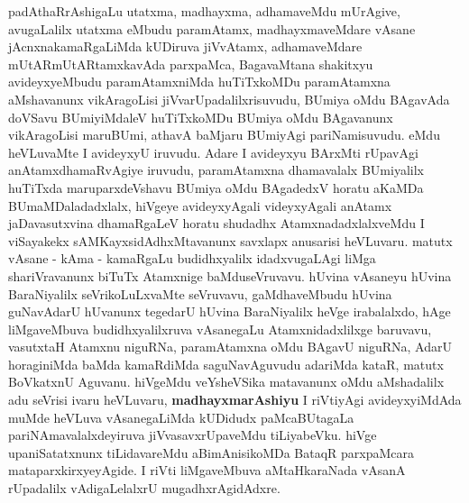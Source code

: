 \begin{artha}
padAthaRrAshigaLu utatxma, madhayxma, adhamaveMdu mUrAgive,
avugaLalilx utatxma eMbudu paramAtamx, madhayxmaveMdare vAsane
jAcnxnakamaRgaLiMda kUDiruva jiVvAtamx, adhamaveMdare
mUtARmUtARtamxkavAda parxpaMca, BagavaMtana \-shakitxyu avideyxyeMbudu
paramAtamxniMda huTiTxkoMDu paramAtamxna aMshavanunx vikAra\-goLisi
jiVvarUpadalilxrisuvudu, BUmiya oMdu BAgavAda doVSavu BUmi\-yiMdaleV
huTiTxkoMDu BUmiya oMdu BAgavanunx vikAragoLisi maruBUmi, athavA
baMjaru BUmiyAgi pariNamisuvudu. eMdu heVLuvaMte I \break avideyxyU
iruvudu. Adare I avideyxyu BArxMti rUpavAgi anAtamxdhamaR\-vAgiye
iruvudu, paramAtamxna dhamavalalx BUmiyalilx huTiTxda maruparxdeVshavu
BUmiya oMdu BAgadedxV horatu aKaMDa BUmaMDaladadxlalx, hiVgeye
avideyx\-yAgali videyxyAgali anAtamx jaDavasutxvina dhamaRgaLeV horatu
shudadhx Atamxnadadxlalx\-veMdu I viSayakekx sAMKayxsidAdhxMtavanunx
savxlapx anusarisi heVLuvaru. matutx vAsane - kAma - kamaRgaLu
budidhxyalilx idadxvugaLAgi liMga shariVravanunx biTuTx Atamxnige
baMduseVruvavu. hUvina vAsaneyu hUvina BaraNiyalilx seVrikoLuLxvaMte
seVru\-vavu, gaMdhaveMbudu hUvina guNavAdarU hUvanunx tegedarU hUvina
BaraNi\-yalilx heVge irabalalxdo, hAge liMgaveMbuva budidhxyalilxruva
vAsanegaLu Atamx\-nidadxlilxge baruvavu, vasutxtaH Atamxnu niguRNa,
paramAtamxna oMdu BAgavU \break niguRNa, AdarU horaginiMda baMda kamaRdiMda
saguNavAguvudu adariMda kataR, matutx BoVkatxnU Aguvanu. hiVgeMdu
veYsheVSika matavanunx oMdu aMshadalilx adu seVrisi ivaru heVLuvaru,
\textbf{madhayxmarAshiyu} I riVtiyAgi avideyxyiMdAda muMde heVLuva
vAsanegaLiMda kUDidudx paMcaBUtagaLa pariNAmavalalxdeyiruva
jiVvasavxrUpaveMdu tiLiyabeVku. hiVge upaniSatatxnunx tiLidavareMdu
aBimAnisi\-koMDa BataqR parxpaMcara mataparxkirxyeyAgide. I riVti
liMgaveMbuva aMtaHkaraNada vAsanA rUpadalilx vAdigaLelalxrU mugadhxrAgidAdxre.
\end{artha}

\centerline{}

